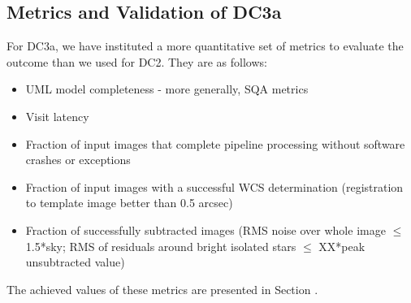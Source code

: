 \subsection{Metrics and Validation of DC3a}

For DC3a, we have instituted a more quantitative set of metrics to
evaluate the outcome than we used for DC2.  They are as follows:

\begin{itemize}
\item UML model completeness - more generally, SQA metrics
\item Visit latency
\item Fraction of input images that complete pipeline processing
  without software crashes or exceptions
\item Fraction of input images with a successful WCS determination
  (registration to template image better than 0.5 arcsec)
\item Fraction of successfully subtracted images (RMS noise over whole
  image $\leq$ 1.5*sky; RMS of residuals around bright isolated stars
  $\leq$ XX*peak unsubtracted value)
\end{itemize}

The achieved values of these metrics are presented in Section .
